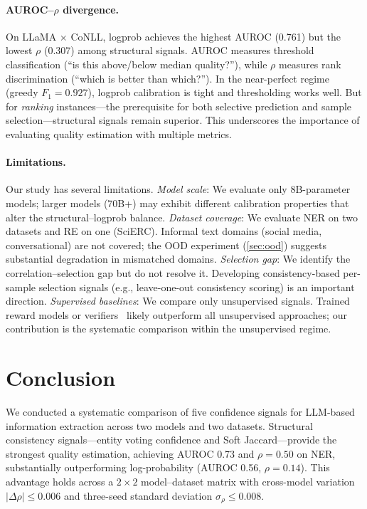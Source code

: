 \documentclass[11pt]{article}
\begin{document}
\paragraph{AUROC--$\rho$ divergence.}
On LLaMA $\times$ CoNLL, logprob achieves the highest AUROC (0.761) but the lowest $\rho$ (0.307) among structural signals.
AUROC measures threshold classification (``is this above/below median quality?''), while $\rho$ measures rank discrimination (``which is better than which?'').
In the near-perfect regime (greedy $F_1{=}0.927$), logprob calibration is tight and thresholding works well.
But for \emph{ranking} instances---the prerequisite for both selective prediction and sample selection---structural signals remain superior.
This underscores the importance of evaluating quality estimation with multiple metrics.

\paragraph{Limitations.}
Our study has several limitations.
\emph{Model scale}: We evaluate only 8B-parameter models; larger models (70B+) may exhibit different calibration properties that alter the structural--logprob balance.
\emph{Dataset coverage}: We evaluate NER on two datasets and RE on one (SciERC). Informal text domains (social media, conversational) are not covered; the OOD experiment (\cref{sec:ood}) suggests substantial degradation in mismatched domains.
\emph{Selection gap}: We identify the correlation--selection gap but do not resolve it. Developing consistency-based per-sample selection signals (e.g., leave-one-out consistency scoring) is an important direction.
\emph{Supervised baselines}: We compare only unsupervised signals. Trained reward models or verifiers~\cite{cobbe2021training,lightman2023lets} likely outperform all unsupervised approaches; our contribution is the systematic comparison within the unsupervised regime.

\section{Conclusion}

We conducted a systematic comparison of five confidence signals for LLM-based information extraction across two models and two datasets.
Structural consistency signals---entity voting confidence and Soft Jaccard---provide the strongest quality estimation, achieving AUROC 0.73 and $\rho{=}0.50$ on NER, substantially outperforming log-probability (AUROC 0.56, $\rho{=}0.14$).
This advantage holds across a $2{\times}2$ model--dataset matrix with cross-model variation $|\Delta\rho|{\le}0.006$ and three-seed standard deviation $\sigma_\rho{\le}0.008$.
\end{document}
